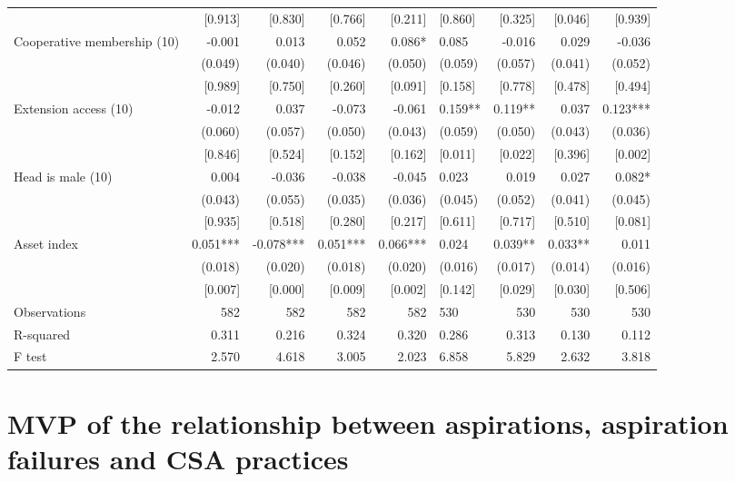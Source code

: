 \documentclass[
]{article}
\begin{document}
\begin{landscape}
\begin{ThreePartTable}
\begin{longtable}[t]{lrrrrlrrr}
 & {}[0.913] & {}[0.830] & {}[0.766] & {}[0.211] & {}[0.860] & {}[0.325] & {}[0.046] & {}[0.939]\\
Cooperative membership (1\/0) & -0.001 & 0.013 & 0.052 & 0.086* & 0.085 & -0.016 & 0.029 & -0.036\\
 & (0.049) & (0.040) & (0.046) & (0.050) & (0.059) & (0.057) & (0.041) & (0.052)\\
 & {}[0.989] & {}[0.750] & {}[0.260] & {}[0.091] & {}[0.158] & {}[0.778] & {}[0.478] & {}[0.494]\\
Extension access (1\/0) & -0.012 & 0.037 & -0.073 & -0.061 & 0.159** & 0.119** & 0.037 & 0.123***\\
 & (0.060) & (0.057) & (0.050) & (0.043) & (0.059) & (0.050) & (0.043) & (0.036)\\
 & {}[0.846] & {}[0.524] & {}[0.152] & {}[0.162] & {}[0.011] & {}[0.022] & {}[0.396] & {}[0.002]\\
Head is male (1\/0) & 0.004 & -0.036 & -0.038 & -0.045 & 0.023 & 0.019 & 0.027 & 0.082*\\
 & (0.043) & (0.055) & (0.035) & (0.036) & (0.045) & (0.052) & (0.041) & (0.045)\\
 & {}[0.935] & {}[0.518] & {}[0.280] & {}[0.217] & {}[0.611] & {}[0.717] & {}[0.510] & {}[0.081]\\
Asset index & 0.051*** & -0.078*** & 0.051*** & 0.066*** & 0.024 & 0.039** & 0.033** & 0.011\\
 & (0.018) & (0.020) & (0.018) & (0.020) & (0.016) & (0.017) & (0.014) & (0.016)\\
 & {}[0.007] & {}[0.000] & {}[0.009] & {}[0.002] & {}[0.142] & {}[0.029] & {}[0.030] & {}[0.506]\\
Observations & 582 & 582 & 582 & 582 & 530 & 530 & 530 & 530\\
R-squared & 0.311 & 0.216 & 0.324 & 0.320 & 0.286 & 0.313 & 0.130 & 0.112\\
F test & 2.570 & 4.618 & 3.005 & 2.023 & 6.858 & 5.829 & 2.632 & 3.818\\*
\end{longtable}
\end{ThreePartTable}
\endgroup{}
\end{landscape}
\newpage

\newpage

\hypertarget{mvp-of-the-relationship-between-aspirations-aspiration-failures-and-csa-practices}{%
\section{MVP of the relationship between aspirations, aspiration failures and CSA practices}\label{mvp-of-the-relationship-between-aspirations-aspiration-failures-and-csa-practices}}
\end{document}

